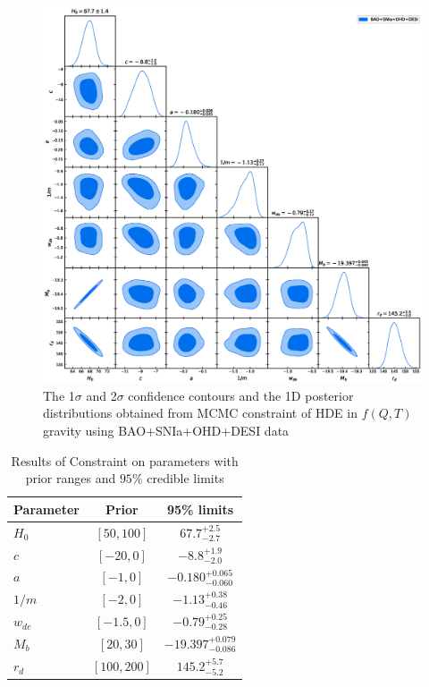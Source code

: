 \documentclass[a4paper,fleqn]{cas-sc}
\begin{document}
\begin{figure}
    \centering
    \includegraphics[width=1\linewidth]{./pic/getdist.eps}
    \caption{\label{fig:constraint} The 1$\sigma$ and 2$\sigma$ confidence contours and the 1D posterior distributions obtained from MCMC constraint of HDE in $f(Q,T)$ gravity using BAO+SNIa+OHD+DESI data}
\end{figure}


\begin{table}
    \centering
    \caption{Results of Constraint on parameters with prior ranges and $95\%$ credible limits}
    \begin{tabular} { l  c  c}
        \hline\hline
        Parameter & Prior & 95\% limits\\
        \hline
        {\boldmath$H_0            $} & $[50, 100]$ & $67.7^{+2.5}_{-2.7}$ \\
        
        {\boldmath$c              $} & $[-20, 0]$ & $-8.8^{+1.9}_{-2.0}$ \\
        
        {\boldmath$a              $} & $[-1, 0]$ & $-0.180^{+0.065}_{-0.060}$ \\
        
        {\boldmath$1/m            $} & $[-2, 0]$ & $-1.13^{+0.38}_{-0.46}$ \\
        
        {\boldmath$w_{de}         $} & $[-1.5, 0]$ & $-0.79^{+0.25}_{-0.28}$ \\
        
        {\boldmath$M_b            $} & $[20, 30]$ & $-19.397^{+0.079}_{-0.086}$ \\
        
        {\boldmath$r_d            $} & $[100, 200]$ & $145.2^{+5.7}_{-5.2}$ \\
        \hline
    \end{tabular}

    \label{tab:results}
\end{table}
\end{document}
